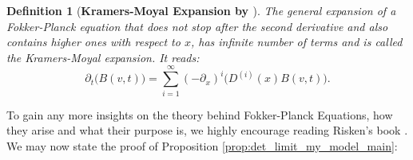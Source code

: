 \documentclass[12pt,a4paper,twoside]{article}
\newtheorem{definition}{Definition}[section]
\begin{document}
\begin{definition}[\textbf{Kramers-Moyal Expansion by \cite{Risken1989}}]
	The general expansion of a Fokker-Planck equation that does not stop after the second derivative and also contains higher ones with respect to $x$, has infinite number of terms and is called the Kramers-Moyal expansion. It reads:
	\begin{equation*}
		\partial_t\big(B\left(v,t\right)\big) = \sum_{i = 1}^{\infty}\left(-\partial_x\right)^i \big(D^{(i)}(x) B\left(v,t\right)\big).
	\end{equation*}
\end{definition}

To gain any more insights on the theory behind Fokker-Planck Equations, how they arise and what their purpose is, we highly encourage reading Risken's book \cite{Risken1989}. We may now state the proof of Proposition \ref{prop:det_limit_my_model_main}:
\end{document}
